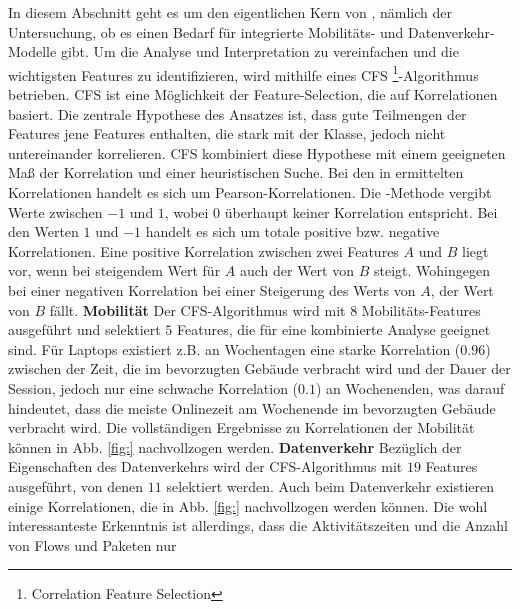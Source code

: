 \documentclass[12pt, a4paper]{article}
\begin{document}
In diesem Abschnitt geht es um den eigentlichen Kern von \cite{Alipour2018}, nämlich der Untersuchung, ob es einen Bedarf
für integrierte Mobilitäts- und Datenverkehr-Modelle gibt. Um die Analyse und Interpretation zu vereinfachen und die 
wichtigsten Features zu identifizieren, wird mithilfe eines \textsc{CFS} \footnote{Correlation Feature Selection}-Algorithmus
 betrieben. \textsc{CFS} ist eine Möglichkeit der Feature-Selection, die auf Korrelationen
basiert. Die zentrale Hypothese des Ansatzes ist, dass gute Teilmengen der Features jene Features enthalten, die stark
mit der Klasse, jedoch nicht untereinander korrelieren. \textsc{CFS} kombiniert diese Hypothese mit einem geeigneten
Maß der Korrelation und einer heuristischen Suche. \cite{Hall2000}
Bei den in \cite{Alipour2018} ermittelten Korrelationen handelt es sich um Pearson-Korrelationen.
Die -Methode vergibt Werte zwischen $-1$ und $1$, wobei $0$ überhaupt keiner Korrelation
entspricht. Bei den Werten $1$ und $-1$ handelt es sich um totale positive bzw. negative Korrelationen.
Eine positive Korrelation zwischen zwei Features $A$ und $B$ liegt vor, wenn bei steigendem Wert für $A$
auch der Wert von $B$ steigt. Wohingegen bei einer negativen Korrelation bei einer Steigerung des Werts von $A$, 
der Wert von $B$ fällt. \cite{Nettleton2014}
\newline\newline
\textbf{Mobilität}\newline
Der \textsc{CFS}-Algorithmus wird mit $8$ Mobilitäts-Features ausgeführt und selektiert $5$ Features, 
die für eine kombinierte Analyse geeignet sind. Für Laptops existiert z.B. an Wochentagen eine starke Korrelation ($0.96$)
zwischen der Zeit, die im bevorzugten Gebäude verbracht wird und der Dauer der Session, jedoch nur eine schwache Korrelation
($0.1$) an Wochenenden, was darauf hindeutet, dass die meiste Onlinezeit am Wochenende im bevorzugten
Gebäude verbracht wird. \cite{Alipour2018} Die vollständigen Ergebnisse zu Korrelationen der Mobilität können in
Abb. \ref{fig:} nachvollzogen werden.
\newline\newline
\textbf{Datenverkehr}\newline
Bezüglich der Eigenschaften des Datenverkehrs wird der \textsc{CFS}-Algorithmus mit $19$ Features ausgeführt, von denen $11$
selektiert werden. Auch beim Datenverkehr existieren einige Korrelationen, die in Abb. \ref{fig:} nachvollzogen werden können.
Die wohl interessanteste Erkenntnis ist allerdings, dass die Aktivitätszeiten und die Anzahl von Flows und Paketen nur
\end{document}

